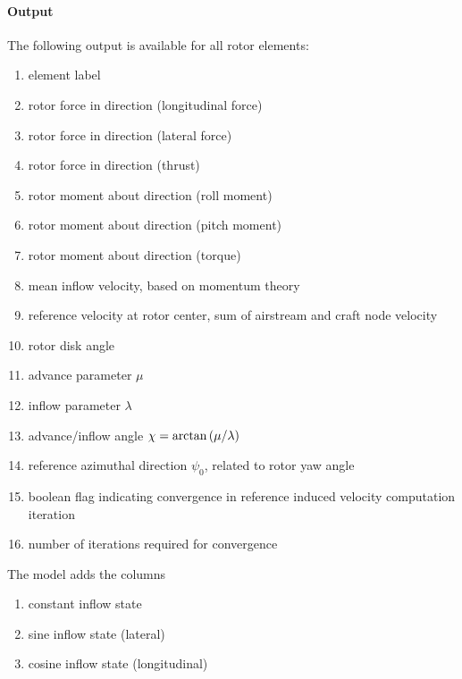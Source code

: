 \paragraph{Output}
The following output is available for all rotor elements:
\begin{enumerate}
\item element label
\item rotor force in  direction (longitudinal force)
\item rotor force in  direction (lateral force)
\item rotor force in  direction (thrust)
\item rotor moment about  direction (roll moment)
\item rotor moment about  direction (pitch moment)
\item rotor moment about  direction (torque)
\item mean inflow velocity, based on momentum theory
\item reference velocity at rotor center, sum of airstream
	and craft node velocity
\item rotor disk angle
\item advance parameter $\mu$
\item inflow parameter $\lambda$
\item advance/inflow angle $\chi=\arctan\left( \mu/\lambda \right)$
\item reference azimuthal direction $\psi_0$, related to rotor yaw angle
\item boolean flag indicating convergence in reference induced velocity
	computation iteration
\item number of iterations required for convergence
\setcounter{elem_rotor_output}{\value{enumi}}
\end{enumerate}
The  model adds the columns
\begin{enumerate}
\setcounter{enumi}{\value{elem_rotor_output}}
\item constant inflow state
\item sine inflow state (lateral)
\item cosine inflow state (longitudinal)
\end{enumerate}

